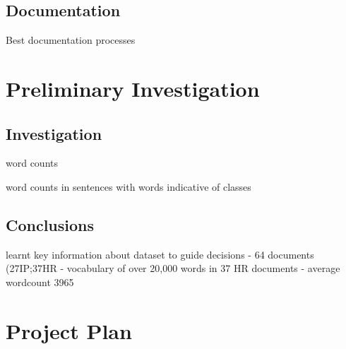 		\subsection{Documentation}
			Best documentation processes
	\section{Preliminary Investigation}
		\subsection{Investigation}
			word counts
			
			word counts in sentences with words indicative of classes
		\subsection{Conclusions}
			learnt key information about dataset to guide decisions - 64 documents (27IP;37HR - vocabulary of over 20,000 words in 37 HR documents - average wordcount 3965
	\section{Project Plan}
